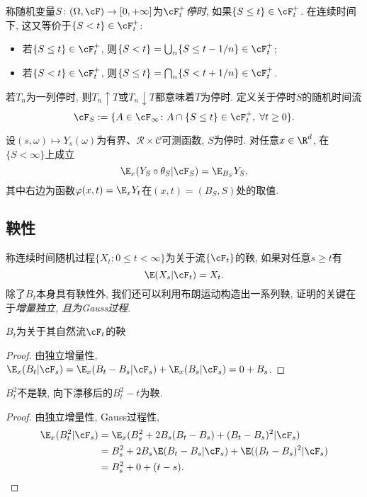 \documentclass[a4paper, 10pt]{ctexart}
\begin{document}
称随机变量$S \colon (\Omega, \cF) \to [0, +\infty]$为$\cF_t^+$\emph{停时}, 如果$\{S \leq t\} \in \cF_t^+$. 
在连续时间下, 这又等价于$\{S < t\} \in \cF_t^+$: 
\begin{itemize}
	\item 若$\{S \leq t\} \in \cF_t^+$, 则$\{S < t\} = \bigcup_n \{S \leq t - 1/n\} \in \cF_t^+$; 
	\item 若$\{S < t\} \in \cF_t^+$, 则$\{S \leq t\} = \bigcap_n \{S < t + 1/n\} \in \cF_t^+$. 
\end{itemize}
若$T_n$为一列停时, 则$T_n \uparrow T$或$T_n \downarrow T$都意味着$T$为停时. 
定义关于停时$S$的随机时间流
\begin{equation*}
	\cF_S := \{ A \in \cF_{\infty} \colon A \cap \{S \leq t\} \in \cF_t^+,\; \forall t \geq 0\}. 
\end{equation*}

\begin{theorem}[强Markov性]
	设$(s, \omega) \mapsto Y_s(\omega)$为有界、$\mathcal R \times \mathcal C$可测函数, $S$为停时. 
	对任意$x \in \R^d$, 在$\{S < \infty\}$上成立
	\begin{equation*}
		\E_x(Y_S \circ \theta_S | \cF_S) = \E_{B_S} Y_S, 
	\end{equation*}
	其中右边为函数$\varphi(x, t) = \E_x Y_t$在$(x, t) = (B_S, S)$处的取值. 
\end{theorem}

\subsection{鞅性}
\noindent
称连续时间随机过程$\{X_t; 0 \leq t < \infty\}$为关于流$\{\cF_t\}$的鞅, 如果对任意$s \geq t$有
\begin{equation*}
	\E(X_s | \cF_t) = X_t. 
\end{equation*}
除了$B_t$本身具有鞅性外, 我们还可以利用布朗运动构造出一系列鞅, 证明的关键在于\emph{增量独立, 且为Gauss过程}. 

\begin{theorem}[布朗运动的鞅性]
	$B_t$为关于其自然流$\cF_t$的鞅
\end{theorem}
\begin{proof}
	由独立增量性, $\E_x(B_t | \cF_s) = \E_x(B_t - B_s| \cF_s) + \E_x(B_s | \cF_s) = 0 +  B_s$. 
\end{proof}

\begin{theorem}\label{thm:BM^2-t}
	$B_t^2$不是鞅, 向下漂移后的$B_t^2 - t$为鞅. 
\end{theorem}
\begin{proof}
	由独立增量性, Gauss过程性, 
	\begin{align*}
		\E_x(B_t^2|\cF_s)
		&= \E_x(B_s^2 + 2 B_s (B_t - B_s) + (B_t - B_s)^2 | \cF_s) \\
		&= B_s^2 + 2 B_s \E(B_t - B_s | \cF_s) + \E((B_t - B_s)^2 | \cF_s) \\
		&= B_s^2 + 0 + (t-s). 
	\end{align*}
\end{proof}
\end{document}
